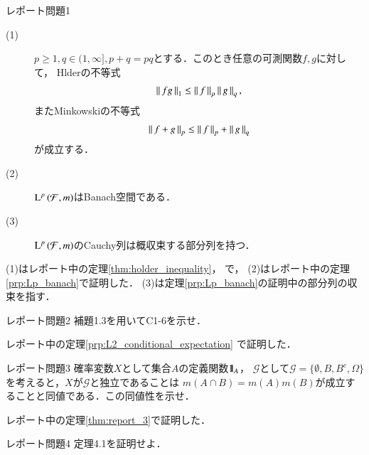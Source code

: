 \newpage
\begin{itembox}[l]{レポート問題1}
	\begin{description}
		\item[(1)]
			$p \geq 1, q \in (1,\infty],p+q = p q$とする．このとき任意の可測関数$f,g$に対して，
			Hlderの不等式
			\begin{align}
				\left\|\, fg\, \right\|_{1} \leq \left\|\, f\, \right\|_{p} \left\|\, g\, \right\|_{q},
			\end{align}
			またMinkowskiの不等式
			\begin{align}
				\left\|\, f + g\, \right\|_{p} \leq \left\|\, f\, \right\|_{p} + \left\|\, g\, \right\|_{q}
			\end{align}
			が成立する．
	
		\item[(2)]
			$\operatorname{L}^{p} \left(\mathcal{F},m\right)$はBanach空間である．
	
		\item[(3)]
			$\operatorname{L}^{p} \left(\mathcal{F},m\right)$のCauchy列は概収束する部分列を持つ．
	\end{description}
\end{itembox}

\begin{prf}
	(1)はレポート中の定理\ref{thm:holder_inequality}，
	で，
	(2)はレポート中の定理\ref{prp:Lp_banach}で証明した．
	(3)は定理\ref{prp:Lp_banach}の証明中の部分列の収束を指す．
	\QED
\end{prf}

\newpage
\begin{itembox}[l]{レポート問題2}
	補題1.3を用いてC1-6を示せ．
\end{itembox}

\begin{prf}
	レポート中の定理\ref{prp:L2_conditional_expectation}
	で証明した．
	\QED
\end{prf}

\newpage
\begin{itembox}[l]{レポート問題3}
	確率変数$X$として集合$A$の定義関数$\mbox{1}\hspace{-0.25em}\mbox{l}_A$，
	$\mathcal{G}$として$\mathcal{G} = \{\emptyset,B,B^c,\Omega \}$
	を考えると，$X$が$\mathcal{G}$と独立であることは
	$m(A \cap B) = m(A)m(B)$が成立することと同値である．この同値性を示せ．
\end{itembox}

\begin{prf}
	レポート中の定理\ref{thm:report_3}で証明した．
	\QED
\end{prf}

\newpage
\begin{itembox}[l]{レポート問題4}
	定理4.1を証明せよ．
\end{itembox}

